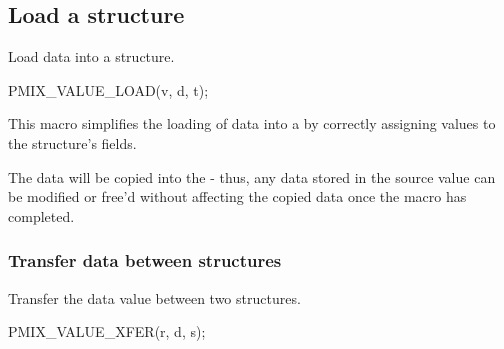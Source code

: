 \begin{arglist}
\end{arglist}

\subsection{Load a  structure}

\summary

Load data into a  structure.

\cspecificstart
\begin{codepar}
PMIX_VALUE_LOAD(v, d, t);
\end{codepar}
\cspecificend

\begin{arglist}
\end{arglist}

\descr

This macro simplifies the loading of data into a  by correctly assigning values to the structure's fields.

\adviceuserstart
The data will be copied into the  - thus, any data stored in the source value can be modified or free'd without affecting the copied data once the macro has completed.
\adviceuserend


\subsubsection{Transfer data between  structures}

\summary

Transfer the data value between two  structures.

\cspecificstart
\begin{codepar}
PMIX_VALUE_XFER(r, d, s);
\end{codepar}
\cspecificend

\begin{arglist}
\end{arglist}

